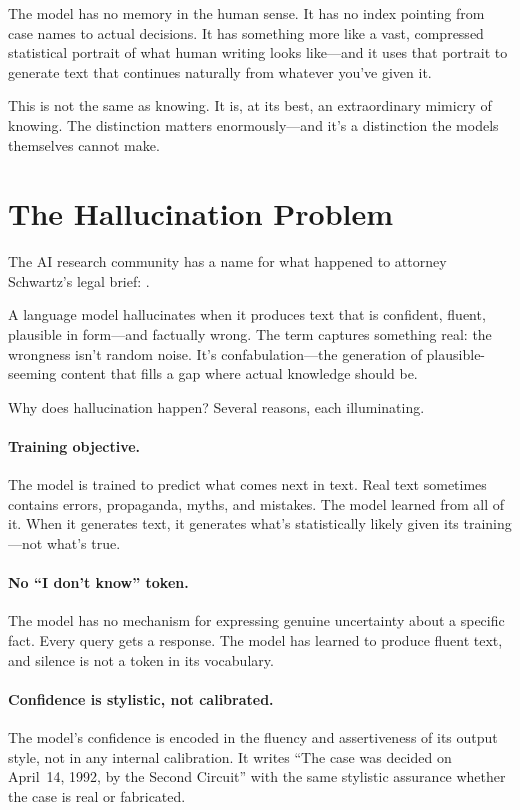 The model has no memory in the human sense. It has no index pointing from case names to actual decisions. It has something more like a vast, compressed statistical portrait of what human writing looks like---and it uses that portrait to generate text that continues naturally from whatever you've given it.

This is not the same as knowing. It is, at its best, an extraordinary mimicry of knowing. The distinction matters enormously---and it's a distinction the models themselves cannot make.

\section{The Hallucination Problem}
\label{sec:hallucination}

The AI research community has a name for what happened to attorney Schwartz's legal brief: .

A language model hallucinates when it produces text that is confident, fluent, plausible in form---and factually wrong. The term captures something real: the wrongness isn't random noise. It's confabulation---the generation of plausible-seeming content that fills a gap where actual knowledge should be.

Why does hallucination happen? Several reasons, each illuminating.

\paragraph{Training objective.} The model is trained to predict what comes next in text. Real text sometimes contains errors, propaganda, myths, and mistakes. The model learned from all of it. When it generates text, it generates what's statistically likely given its training---not what's true.

\paragraph{No ``I don't know'' token.} The model has no mechanism for expressing genuine uncertainty about a specific fact. Every query gets a response. The model has learned to produce fluent text, and silence is not a token in its vocabulary.

\paragraph{Confidence is stylistic, not calibrated.} The model's confidence is encoded in the fluency and assertiveness of its output style, not in any internal calibration. It writes ``The case was decided on April~14, 1992, by the Second Circuit'' with the same stylistic assurance whether the case is real or fabricated.

